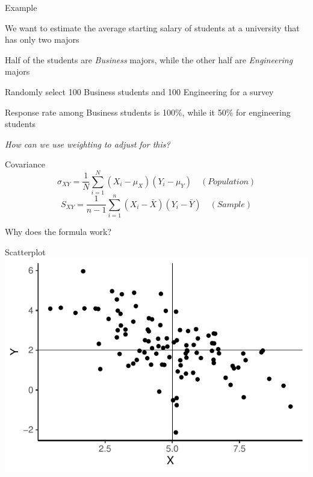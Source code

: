 \documentclass{./../div_teaching_slides}
\begin{document}
\begin{frame}{Example}
\vspace{-0.5em}
\begin{witemize}
	\item We want to estimate the average starting salary of students at a university that has only two majors	\item Half of the students are \textit{Business} majors, while the other half are \textit{Engineering} majors
	\item Randomly select 100 Business students and 100 Engineering for a survey
	\item Response rate among Business students is 100\%, while it 50\% for engineering students 
	\item[] \textit{How can we use weighting to adjust for this?}
\end{witemize}
\end{frame}	

\begin{frame}{Covariance}
	$$ \sigma_{XY} = \frac{1}{N}\sum_{i=1}^N (X_i-\mu_X)(Y_i-\mu_Y) \quad (Population) $$
	\vspace{1em}
$$ S_{XY} = \frac{1}{n-1}\sum_{i=1}^n (X_i-\bar{X})(Y_i-\bar{Y}) \quad (Sample) $$ 

\vspace{1cm}
Why does the formula work?
\end{frame}

\begin{frame}{Scatterplot}
\centering
\includegraphics{./../../output/corr_midterm}
\end{frame}
\end{document}
